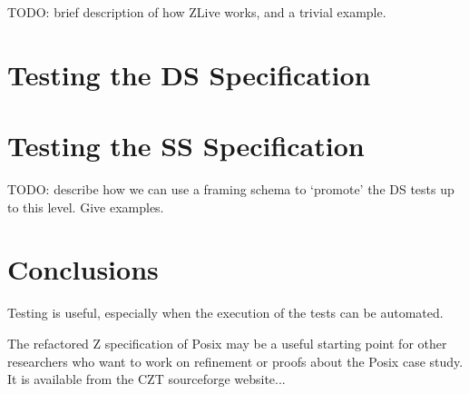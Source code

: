 \documentclass{llncs}
\begin{document}
TODO: brief description of how ZLive works, and a trivial example.


\section{Testing the DS Specification}




\section{Testing the SS Specification}

TODO: describe how we can use a framing schema to `promote' the DS tests
up to this level.  Give examples.


\section{Conclusions}

Testing is useful, especially when the execution of the tests can
be automated.

The refactored Z specification of Posix may be a useful starting point
for other researchers who want to work on refinement or proofs
about the Posix case study.  It is available from the CZT sourceforge
website...


%
%


%
\end{document}
